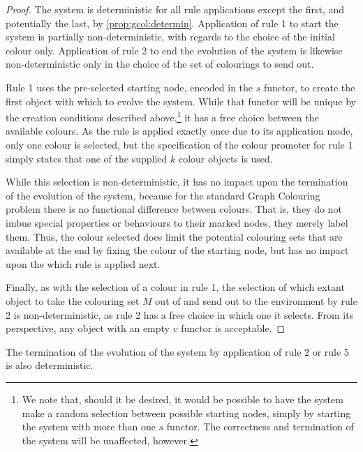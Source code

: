\begin{proof}
The system is deterministic for all rule applications except the first, and potentially the last, by \autoref{prop:gcol:determin}.  Application of rule 1 to start the system is partially non-deterministic, with regards to the choice of the initial colour only.  Application of rule 2 to end the evolution of the system is likewise non-deterministic only in the choice of the set of colourings to send out.

Rule 1 uses the pre-selected starting node, encoded in the \(s\) functor, to create the first \bo{} object with which to evolve the system.  While that functor will be unique by the creation conditions described above,\footnote{We note that, should it be desired, it would be possible to have the system make a random selection between possible starting nodes, simply by starting the system with more than one \(s\) functor.  The correctness and termination of the system will be unaffected, however.} it has a free choice between the available colours.  As the rule is applied exactly once due to its application mode, only one colour is selected, but the specification of the colour promoter for rule 1 simply states that one of the supplied \(k\) colour objects is used.

While this selection is non-deterministic, it has no impact upon the termination of the evolution of the system, because for the standard Graph Colouring problem there is no functional difference between colours.  That is, they do not imbue special properties or behaviours to their marked nodes, they merely label them.  Thus, the colour selected does limit the potential colouring sets that are available at the end by fixing the colour of the starting node, but has no impact upon the which rule is applied next.

Finally, as with the selection of a colour in rule 1, the selection of which extant \bo{} object to take the colouring set \(M\) out of and send out to the environment by rule 2 is non-deterministic, as rule 2 has a free choice in which one it selects.  From its perspective, any \bo{} object with an empty \(v\) functor is acceptable.
\end{proof}

\begin{proposition}\label{prop:gcol:ending}
The termination of the evolution of the system by application of rule 2 or rule 5 is also deterministic.
\end{proposition}

